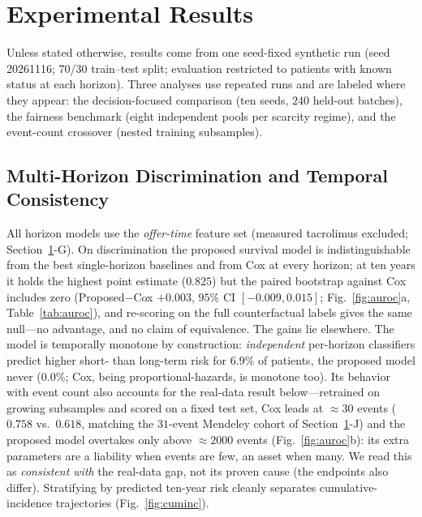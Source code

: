 \documentclass[journal]{IEEEtran}
\begin{document}
\section{Experimental Results}
\label{sec:results}
Unless stated otherwise, results come from one seed-fixed synthetic run (seed 20261116; 70/30 train--test split; evaluation restricted to patients with known status at each horizon). Three analyses use repeated runs and are labeled where they appear: the decision-focused comparison (ten seeds, $240$ held-out batches), the fairness benchmark (eight independent pools per scarcity regime), and the event-count crossover (nested training subsamples).

\subsection{Multi-Horizon Discrimination and Temporal Consistency}
All horizon models use the \emph{offer-time} feature set (measured tacrolimus excluded; Section~\ref{sec:results}-G). On discrimination the proposed survival model is indistinguishable from the best single-horizon baselines and from Cox at every horizon; at ten years it holds the highest point estimate ($0.825$) but the paired bootstrap against Cox includes zero (Proposed$-$Cox $+0.003$, $95\%$ CI $[-0.009,0.015]$; Fig.~\ref{fig:auroc}a, Table~\ref{tab:auroc}), and re-scoring on the full counterfactual labels gives the same null---no advantage, and no claim of equivalence. The gains lie elsewhere. The model is temporally monotone by construction: \emph{independent} per-horizon classifiers predict higher short- than long-term risk for $6.9\%$ of patients, the proposed model never ($0.0\%$; Cox, being proportional-hazards, is monotone too). Its behavior with event count also accounts for the real-data result below---retrained on growing subsamples and scored on a fixed test set, Cox leads at ${\approx}30$ events ($0.758$ vs.\ $0.618$, matching the $31$-event Mendeley cohort of Section~\ref{sec:results}-J) and the proposed model overtakes only above ${\approx}2000$ events (Fig.~\ref{fig:auroc}b): its extra parameters are a liability when events are few, an asset when many. We read this as \emph{consistent with} the real-data gap, not its proven cause (the endpoints also differ). Stratifying by predicted ten-year risk cleanly separates cumulative-incidence trajectories (Fig.~\ref{fig:cuminc}).
\end{document}
